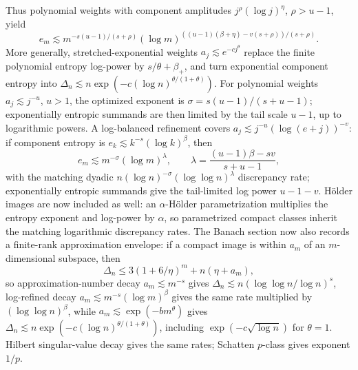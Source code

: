 \documentclass[11pt]{article}
\begin{document}
Thus polynomial weights with component amplitudes
\(j^\rho(\log j)^\eta\), \(\rho>u-1\), yield
\[
  e_m\lesssim
  m^{-s(u-1)/(s+\rho)}
  (\log m)^{((u-1)(\beta+\eta)-v(s+\rho))/(s+\rho)}.
\]
More generally, stretched-exponential weights \(a_j\lesssim e^{-cj^\theta}\)
replace the finite polynomial entropy log-power by \(s/\theta+\beta_+\), and
turn exponential component entropy into
\(\Delta_n\lesssim n\exp(-c(\log n)^{\theta/(1+\theta)})\).
For polynomial weights \(a_j\lesssim j^{-u}\), \(u>1\), the optimized exponent
is \(\sigma=s(u-1)/(s+u-1)\); exponentially entropic summands are then limited
by the tail scale \(u-1\), up to logarithmic powers.
A log-balanced refinement covers
\(a_j\lesssim j^{-u}(\log(e+j))^{-v}\): if component entropy is
\(e_k\lesssim k^{-s}(\log k)^\beta\), then
\[
  e_m\lesssim m^{-\sigma}(\log m)^\lambda,
  \qquad
  \lambda=\frac{(u-1)\beta-sv}{s+u-1},
\]
with the matching dyadic
\(n(\log n)^{-\sigma}(\log\log n)^\lambda\) discrepancy rate; exponentially
entropic summands give the tail-limited log power \(u-1-v\).
H\"older images are now included as well:
an \(\alpha\)-H\"older parametrization multiplies the entropy exponent and
log-power by \(\alpha\), so parametrized compact classes inherit the matching
logarithmic discrepancy rates.
The Banach section now also records a finite-rank approximation envelope:
if a compact image is within \(a_m\) of an \(m\)-dimensional subspace, then
\[
  \Delta_n\le 3(1+6/\eta)^m+n(\eta+a_m),
\]
so approximation-number decay \(a_m\lesssim m^{-s}\) gives
\(\Delta_n\lesssim n(\log\log n/\log n)^s\), log-refined decay
\(a_m\lesssim m^{-s}(\log m)^\beta\) gives the same rate multiplied by
\((\log\log n)^\beta\), while
\(a_m\lesssim\exp(-bm^\theta)\) gives
\(\Delta_n\lesssim n\exp(-c(\log n)^{\theta/(1+\theta)})\), including
\(\exp(-c\sqrt{\log n})\) for \(\theta=1\).
Hilbert singular-value decay gives the same rates; Schatten \(p\)-class gives
exponent \(1/p\).
\end{document}
